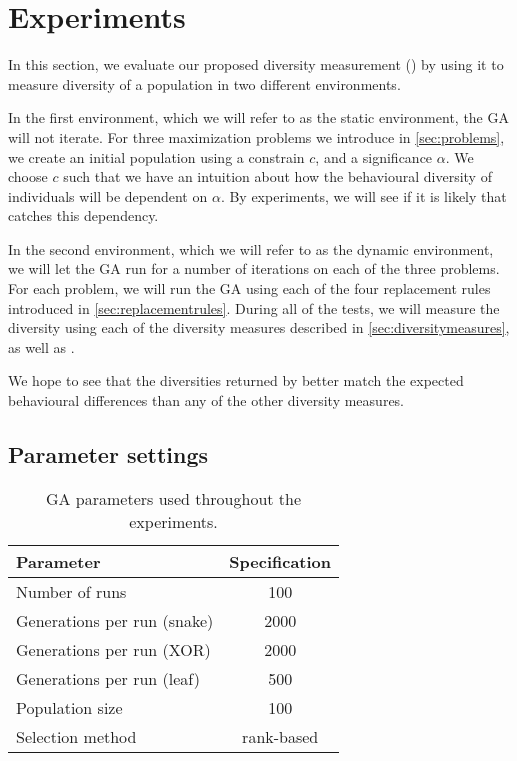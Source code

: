 \section{Experiments}\label{sec:experiments}
In this section, we evaluate our proposed diversity measurement (\dia) by using it to measure diversity of a population in two different environments.

In the first environment, which we will refer to as the static environment, the GA will not iterate.
For three maximization problems we introduce in \cref{sec:problems}, we create an initial population using a constrain $c$, and a significance $\alpha$. We choose $c$ such that we have an intuition about how the behavioural diversity of individuals will be dependent on $\alpha$. By experiments, we will see if it is likely that \dia{} catches this dependency.

In the second environment, which we will refer to as the dynamic environment, we will let the GA run for a number of iterations on each of the three problems. 
For each problem, we will run the GA using each of the four replacement rules introduced in \cref{sec:replacementrules}.
During all of the tests, we will measure the diversity using each of the diversity measures described in \cref{sec:diversitymeasures}, as well as \dia.

We hope to see that the diversities returned by \dia{} better match the expected behavioural differences than any of the other diversity measures.

\subsection{Parameter settings}

\begin{table}
  \centering
  \begin{tabular}{l S}
    \toprule
    Parameter & {Specification} \\
    \midrule
    Number of runs & 100 \\
    Generations per run (snake) & 2000 \\
    Generations per run (XOR) & 2000 \\
    Generations per run (leaf) & 500 \\
    Population size & 100 \\
    Selection method & {rank-based} \\
    \bottomrule
  \end{tabular}
  \caption{GA parameters used throughout the experiments.}
  \label{tab:gaparam}
\end{table}


